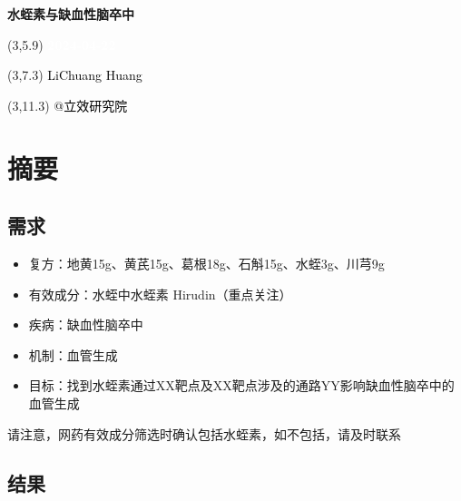 \documentclass[
]{article}
\author{}
\date{\vspace{-2.5em}}
\providecommand{\tightlist}{%
  \setlength{\itemsep}{0pt}\setlength{\parskip}{0pt}}
\begin{document}
\begin{titlepage} 
\begin{center} \textbf{\Huge
水蛭素与缺血性脑卒中} \vspace{4em}
\begin{textblock}{10}(3,5.9) \huge
\textbf{\textcolor{white}{2024-04-22}}
\end{textblock} \begin{textblock}{10}(3,7.3)
\Large \textcolor{black}{LiChuang Huang}
\end{textblock} \begin{textblock}{10}(3,11.3)
\Large \textcolor{black}{@立效研究院}
\end{textblock} \end{center} \end{titlepage}
\restoregeometry


\tableofcontents

\listoffigures

\listoftables

\newpage


\hypertarget{abstract}{%
\section{摘要}\label{abstract}}

\hypertarget{ux9700ux6c42}{%
\subsection{需求}\label{ux9700ux6c42}}

\begin{itemize}
\tightlist
\item
  复方：地黄15g、黄芪15g、葛根18g、石斛15g、水蛭3g、川芎9g
\item
  有效成分：水蛭中水蛭素 Hirudin（重点关注）
\item
  疾病：缺血性脑卒中
\item
  机制：血管生成
\item
  目标：找到水蛭素通过XX靶点及XX靶点涉及的通路YY影响缺血性脑卒中的血管生成
\end{itemize}

请注意，网药有效成分筛选时确认包括水蛭素，如不包括，请及时联系

\hypertarget{ux7ed3ux679c}{%
\subsection{结果}\label{ux7ed3ux679c}}
\end{document}
